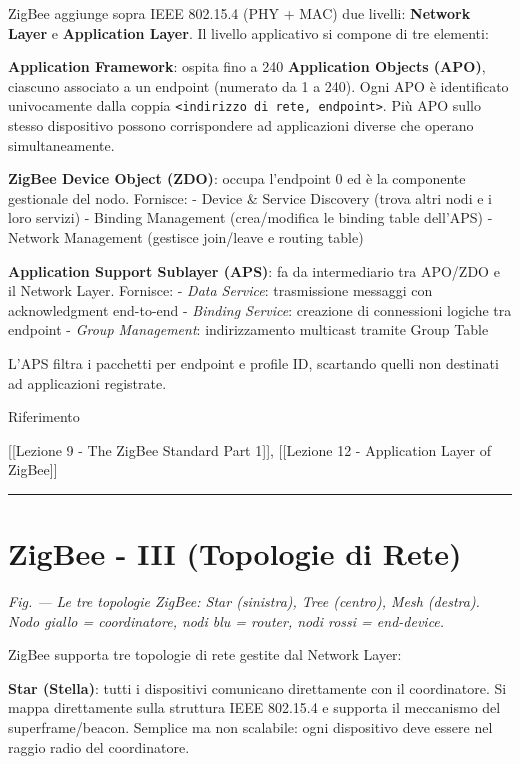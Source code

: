 \documentclass[
  italian,
  openany]{book}
\begin{document}
ZigBee aggiunge sopra IEEE 802.15.4 (PHY + MAC) due livelli:
\textbf{Network Layer} e \textbf{Application Layer}. Il livello
applicativo si compone di tre elementi:

\textbf{Application Framework}: ospita fino a 240 \textbf{Application
Objects (APO)}, ciascuno associato a un endpoint (numerato da 1 a 240).
Ogni APO è identificato univocamente dalla coppia
\texttt{\textless{}indirizzo\ di\ rete,\ endpoint\textgreater{}}. Più
APO sullo stesso dispositivo possono corrispondere ad applicazioni
diverse che operano simultaneamente.

\textbf{ZigBee Device Object (ZDO)}: occupa l'endpoint 0 ed è la
componente gestionale del nodo. Fornisce: - Device \& Service Discovery
(trova altri nodi e i loro servizi) - Binding Management (crea/modifica
le binding table dell'APS) - Network Management (gestisce join/leave e
routing table)

\textbf{Application Support Sublayer (APS)}: fa da intermediario tra
APO/ZDO e il Network Layer. Fornisce: - \emph{Data Service}:
trasmissione messaggi con acknowledgment end-to-end - \emph{Binding
Service}: creazione di connessioni logiche tra endpoint - \emph{Group
Management}: indirizzamento multicast tramite Group Table

L'APS filtra i pacchetti per endpoint e profile ID, scartando quelli non
destinati ad applicazioni registrate.

\begin{calloutnote}{Riferimento}

{[}{[}Lezione 9 - The ZigBee Standard Part 1{]}{]}, {[}{[}Lezione 12 -
Application Layer of ZigBee{]}{]}

\end{calloutnote}

\begin{center}\rule{0.5\linewidth}{0.5pt}\end{center}

\section{ZigBee - III (Topologie di
Rete)}\label{zigbee---iii-topologie-di-rete}

\emph{Fig. --- Le tre topologie ZigBee: Star (sinistra), Tree (centro),
Mesh (destra). Nodo giallo = coordinatore, nodi blu = router, nodi rossi
= end-device.}

ZigBee supporta tre topologie di rete gestite dal Network Layer:

\textbf{Star (Stella)}: tutti i dispositivi comunicano direttamente con
il coordinatore. Si mappa direttamente sulla struttura IEEE 802.15.4 e
supporta il meccanismo del superframe/beacon. Semplice ma non scalabile:
ogni dispositivo deve essere nel raggio radio del coordinatore.
\end{document}
